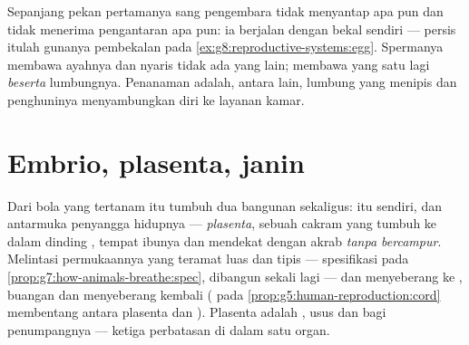 \begin{example}\label{ex:g8:from-egg-to-birth:provisions}
Sepanjang pekan pertamanya sang pengembara tidak menyantap
apa pun dan tidak menerima pengantaran apa pun: ia berjalan
dengan bekal  sendiri --- persis itulah gunanya
pembekalan pada \cref{ex:g8:reproductive-systems:egg}.
Spermanya membawa  ayahnya dan nyaris tidak ada yang
lain;  membawa  yang satu lagi
\emph{beserta} lumbungnya. Penanaman adalah, antara lain,
lumbung yang menipis dan penghuninya menyambungkan diri ke
layanan kamar.
\end{example}

\section{Embrio, plasenta, janin}

\begin{definition}[Plasenta]\label{def:g8:from-egg-to-birth:placenta}
Dari bola yang tertanam itu tumbuh dua bangunan sekaligus:
\emph{} itu sendiri, dan antarmuka penyangga hidupnya
--- \emph{plasenta}, sebuah cakram yang
tumbuh ke dalam dinding , tempat  ibunya dan 
 mendekat dengan akrab \emph{tanpa bercampur}.
Melintasi permukaannya yang teramat luas dan tipis ---
spesifikasi pada \cref{prop:g7:how-animals-breathe:spec},
dibangun sekali lagi ---  dan  menyeberang ke
, buangan dan  menyeberang kembali
( pada \cref{prop:g5:human-reproduction:cord}
membentang antara plasenta dan ). Plasenta adalah
, usus dan  bagi penumpangnya --- ketiga
perbatasan di dalam satu organ.
\end{definition}

